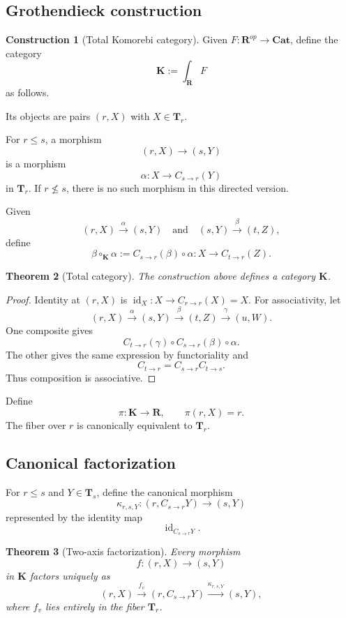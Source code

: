 \documentclass[11pt]{article}
\newtheorem{theorem}{Theorem}[section]
\theoremstyle{definition}
\newtheorem{construction}[theorem]{Construction}
\theoremstyle{remark}
\newcommand{\K}{\mathbf K}
\newcommand{\Rcat}{\mathbf R}
\newcommand{\Tcat}{\mathbf T}
\newcommand{\Cat}{\mathbf{Cat}}
\newcommand{\id}{\operatorname{id}}
\begin{document}
\subsection{Grothendieck construction}

\begin{construction}[Total Komorebi category]\label{cons:groth}
Given $F:\Rcat^{op}\to\Cat$, define the category
\[
\K:=\int_{\Rcat}F
\]
as follows.

Its objects are pairs $(r,X)$ with $X\in\Tcat_r$.

For $r\le s$, a morphism
\[
(r,X)\longrightarrow(s,Y)
\]
is a morphism
\[
\alpha:X\longrightarrow C_{s\to r}(Y)
\]
in $\Tcat_r$. If $r\nleq s$, there is no such morphism in this directed version.
\end{construction}

Given
\[
(r,X)\xrightarrow{\alpha}(s,Y)
\quad\text{and}\quad
(s,Y)\xrightarrow{\beta}(t,Z),
\]
define
\[
\beta\circ_{\K}\alpha
:=
C_{s\to r}(\beta)\circ\alpha:
X\to C_{t\to r}(Z).
\]

\begin{theorem}[Total category]\label{thm:total-category}
The construction above defines a category $\K$.
\end{theorem}

\begin{proof}
Identity at $(r,X)$ is $\id_X:X\to C_{r\to r}(X)=X$. For associativity, let
\[
(r,X)\xrightarrow{\alpha}(s,Y)
\xrightarrow{\beta}(t,Z)
\xrightarrow{\gamma}(u,W).
\]
One composite gives
\[
C_{t\to r}(\gamma)\circ C_{s\to r}(\beta)\circ\alpha.
\]
The other gives the same expression by functoriality and
\[
C_{t\to r}=C_{s\to r}C_{t\to s}.
\]
Thus composition is associative.
\end{proof}

Define
\[
\pi:\K\to\Rcat,
\qquad
\pi(r,X)=r.
\]
The fiber over $r$ is canonically equivalent to $\Tcat_r$.

\subsection{Canonical factorization}

For $r\le s$ and $Y\in\Tcat_s$, define the canonical morphism
\[
\kappa_{r,s,Y}:
(r,C_{s\to r}Y)\longrightarrow(s,Y)
\]
represented by the identity map
\[
\id_{C_{s\to r}Y}.
\]

\begin{theorem}[Two-axis factorization]\label{thm:factorization}
Every morphism
\[
f:(r,X)\longrightarrow(s,Y)
\]
in $\K$ factors uniquely as
\[
(r,X)
\xrightarrow{f_v}
(r,C_{s\to r}Y)
\xrightarrow{\kappa_{r,s,Y}}
(s,Y),
\]
where $f_v$ lies entirely in the fiber $\Tcat_r$.
\end{theorem}
\end{document}
